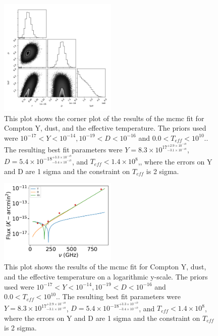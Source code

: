 \documentclass{princeton_astro_thesis}
\begin{document}
\begin{figure}[h]
\centering
\includegraphics[width=0.5\textwidth]{../redmapper_CornerTeffplot.pdf}
\caption{This plot shows the corner plot of the results of the mcmc fit for Compton Y, dust, and the effective temperature. The priors used were $ 10^{-17} < Y < 10^{-14}, 10^{-19}< D < 10^{-16}$ and $0.0 < T_{eff} <10^{10}.$. The resulting best fit parameters were $Y=8.3\times10^{17^{+2.9\times10^{-18}}_{-3.1\times10^{-18}}}$, $D=5.4\times10^{-18^{+3.3\times10^{-19}}_{-3.4\times10^{-19}}}$, and $T_{eff}<1.4\times10^8$,, where the errors on Y and D are 1 sigma and the constraint on $T_{eff}$ is 2 sigma.}
\end{figure}

\begin{figure}[h]
\centering
\includegraphics[width=0.5\textwidth]{../redmapper_apfluxes_Tefffitlog.pdf}
\caption{This plot shows  the results of the mcmc fit for Compton Y, dust, and the effective temperature on a logarithmic y-scale. The priors used were $ 10^{-17} < Y < 10^{-14}, 10^{-19}< D < 10^{-16}$ and $0.0 < T_{eff} <10^{10}.$. The resulting best fit parameters were $Y=8.3\times10^{17^{+2.9\times10^{-18}}_{-3.1\times10^{-18}}}$, $D=5.4\times10^{-18^{+3.3\times10^{-19}}_{-3.4\times10^{-19}}}$, and $T_{eff}<1.4\times10^8$, where the errors on Y and D are 1 sigma and the constraint on $T_{eff}$ is 2 sigma.}
\end{figure}
\end{document}
